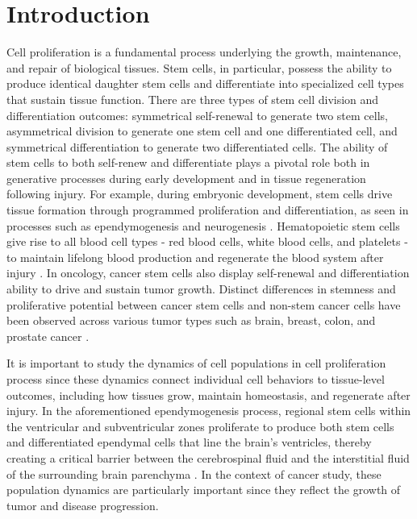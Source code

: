 \documentclass[pdflatex,sn-mathphys-num]{sn-jnl}
\theoremstyle{thmstyleone}%
\theoremstyle{thmstyletwo}%
\theoremstyle{thmstylethree}%
\begin{document}



\maketitle

\section{Introduction}\label{sec1}

Cell proliferation is a fundamental process underlying the growth, maintenance, and repair of biological tissues. Stem cells, in particular, possess the ability to produce identical daughter stem cells and differentiate into specialized cell types that sustain tissue function. There are three types of stem cell division and differentiation outcomes: symmetrical self-renewal to generate two stem cells, asymmetrical division to generate one stem cell and one differentiated cell, and symmetrical differentiation to generate two differentiated cells. The ability of stem cells to both self-renew and differentiate plays a pivotal role both in generative processes during early development and in tissue regeneration following injury. For example, during embryonic development, stem cells drive tissue formation through programmed proliferation and differentiation, as seen in processes such as ependymogenesis and neurogenesis \cite{Co2018, Ba2018}. Hematopoietic stem cells give rise to all blood cell types - red blood cells, white blood cells, and platelets - to maintain lifelong blood production and regenerate the blood system after injury \cite{marciniak2009modeling, wilson2008hematopoietic}. In oncology, cancer stem cells also display self-renewal and differentiation ability to drive and sustain tumor growth. Distinct differences in stemness and proliferative potential between cancer stem cells and non-stem cancer cells have been observed across various tumor types such as brain, breast, colon, and prostate cancer \cite{al2003prospective, cammareri2008isolation, fioriti2008cancer, singh2003identification}.

It is important to study the dynamics of cell populations in cell proliferation process since these dynamics connect individual cell behaviors to tissue-level outcomes, including how tissues grow, maintain homeostasis, and regenerate after injury. In the aforementioned ependymogenesis process, regional stem cells within the ventricular and subventricular zones proliferate to produce both stem cells and differentiated ependymal cells that line the brain’s ventricles, thereby creating a critical barrier between the cerebrospinal fluid and the interstitial fluid of the surrounding brain parenchyma \cite{Co2018}. In the context of cancer study, these population dynamics are particularly important since they reflect the growth of tumor and disease progression.
\end{document}
